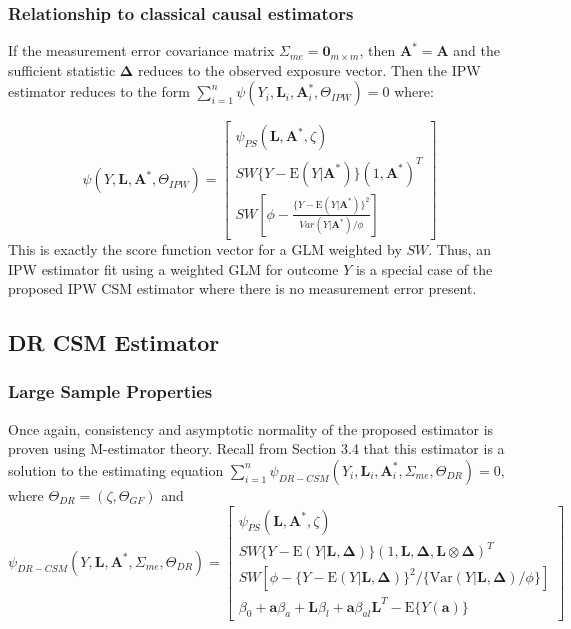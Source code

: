 \documentclass[12pt]{article}
\begin{document}
\subsubsection{Relationship to classical causal estimators}

If the measurement error covariance matrix $\Sigma_{me} = \textbf{0}_{m \times m}$, then $\bm{A}^{*} = \bm{A}$ and the sufficient statistic $\bm{\Delta}$ reduces to the observed exposure vector. Then the IPW estimator reduces to the form $\sum_{i=1}^{n} \psi(Y_{i}, \bm{L}_{i}, \bm{A}^{*}_{i}, \Theta_{IPW}) = 0$ where:

\begin{equation*}
    \psi(Y, \bm{L}, \bm{A}^{*}, \Theta_{IPW}) =
    \begin{bmatrix}
      \psi_{PS}(\bm{L}, \bm{A}^{*}, \zeta) \\
       SW\{ Y - \text{E}(Y | \bm{A}^{*}) \} (1, \bm{A}^{*})^{T} \\
       SW \left [ \phi - \frac{ \{Y - \text{E}(Y | \bm{A}^{*}) \}^{2}}{Var(Y | \bm{A}^{*}) / \phi} \right ]
    \end{bmatrix}
\end{equation*}
This is exactly the score function vector for a GLM weighted by $SW$. Thus, an IPW estimator fit using a weighted GLM for outcome $Y$ is a special case of the proposed IPW CSM estimator where there is no measurement error present.

\subsection{DR CSM Estimator}

\subsubsection{Large Sample Properties}

Once again, consistency and asymptotic normality of the proposed estimator is proven using M-estimator theory. Recall from Section 3.4 that this estimator is a solution to the estimating equation $\sum_{i=1}^{n} \psi_{DR-CSM}(Y_{i}, \bm{L}_{i}, \bm{A}_{i}^{*}, \Sigma_{me}, \Theta_{DR}) = 0$, where $\Theta_{DR} = (\zeta, \Theta_{GF})$ and
\begin{equation*}
    \psi_{DR-CSM}(Y, \bm{L}, \bm{A}^{*}, \Sigma_{me}, \Theta_{DR}) =
    \begin{bmatrix}
        \psi_{PS}(\bm{L}, \bm{A}^{*}, \zeta) \\
       SW\{ Y - \text{E}(Y | \bm{L}, \bm{\Delta}) \} (1, \bm{L}, \bm{\Delta}, \bm{L} \otimes \bm{\Delta})^{T} \\
        SW[\phi - \{ Y - \text{E}(Y | \bm{L}, \bm{\Delta}) \}^{2} / \{ \text{Var}(Y | \bm{L}, \bm{\Delta}) / \phi \}] \\
        \beta_{0} + \bm{a}\beta_{a} + \bm{L}\beta_{l} +
        \bm{a}\beta_{al}\bm{L}^{T} - \text{E} \{ Y(\bm{a}) \}
    \end{bmatrix}
\end{equation*}
\end{document}
